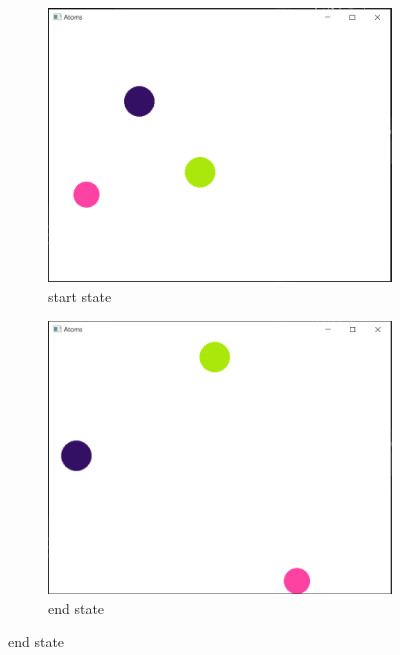 \documentclass[11pt,titlepage]{article}
\begin{document}
				\begin{figure}[h!]
					\centering
					\begin{subfigure}{.5\textwidth}
						\centering
						\includegraphics[scale=0.5]{pictures/random_nocollision.png}
						\caption{start state}
					\end{subfigure}%
					\begin{subfigure}{.5\textwidth}
						\centering
						\includegraphics[scale=0.5]{pictures/random_nocollision_final.png}
						\caption{end state}
					\end{subfigure}
				\end{figure}
	
\end{document}
